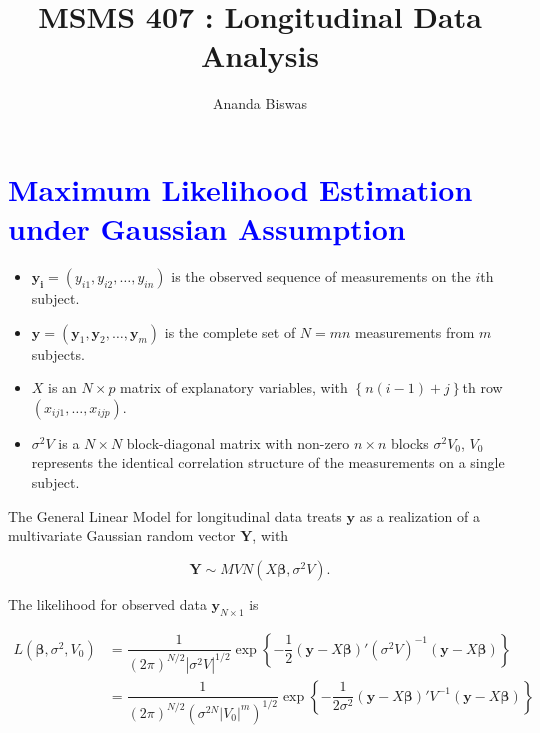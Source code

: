 \documentclass[11pt, a4paper]{article}
\title{MSMS 407 : Longitudinal Data Analysis}
\author{{\fontsize{25}{20} \benyorithafont Ananda Biswas}}
\date{}
\begin{document}
\maketitle

\section*{\faArrowAltCircleRight[regular] \textcolor{blue}{Maximum Likelihood Estimation under Gaussian Assumption}}

\begin{itemize}
\item $\boldsymbol{y_i} = (y_{i1}, y_{i2}, \ldots, y_{in})$ is the observed sequence of measurements on the $i$th subject.

\item $\boldsymbol{y} = (\boldsymbol{y}_1, \boldsymbol{y}_2, \ldots, \boldsymbol{y}_m)$ is the complete set of $N = mn$ measurements from $m$ subjects.

\item $X$ is an $N \times p$ matrix of explanatory variables, with $\left\{n(i-1) + j\right\}$th row $(x_{ij1}, \ldots, x_{ijp})$.

\item $\sigma^2V$ is a $N \times N$ block-diagonal matrix with non-zero $n \times n$ blocks $\sigma^2 V_0$, $V_0$ represents the identical correlation structure of the measurements on a single subject.
\end{itemize}

The General Linear Model for longitudinal data treats $\boldsymbol{y}$ as a realization of a multivariate Gaussian random vector $\boldsymbol{Y}$, with

\begin{equation}
\boldsymbol{Y} \sim MVN(X\boldsymbol{\beta}, \sigma^2 V).
\end{equation}

The likelihood for observed data $\boldsymbol{y}_{N \times 1}$ is

\begin{align}
L(\boldsymbol{\beta}, \sigma^2, V_0) &= \dfrac{1}{(2\pi)^{N/2} \left| \sigma^2 V \right|^{{1}/{2}}} \exp\left\{ - \dfrac{1}{2} (\boldsymbol{y} - X\boldsymbol{\beta})' (\sigma^2 V)^{-1} (\boldsymbol{y} - X\boldsymbol{\beta}) \right\} \nonumber \\[1em]
&= \dfrac{1}{(2\pi)^{N/2} \left( \sigma^{2N} \left| V_0 \right|^m\right)^{{1}/{2}}} \exp\left\{ - \dfrac{1}{2\sigma^2} (\boldsymbol{y} - X\boldsymbol{\beta})' V^{-1} (\boldsymbol{y} - X\boldsymbol{\beta}) \right\}
\end{align}
\end{document}
